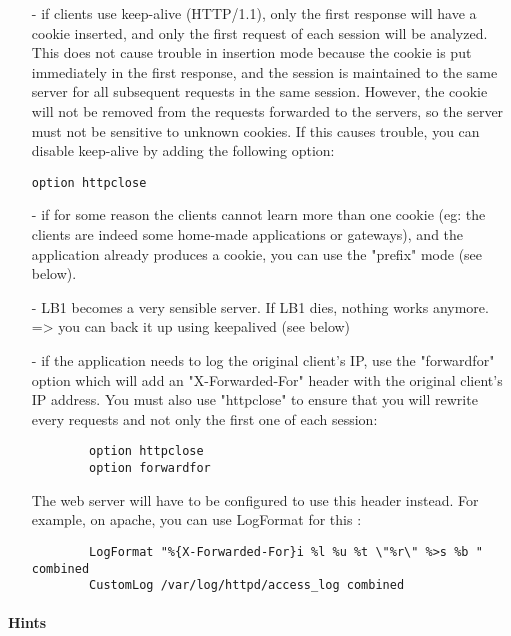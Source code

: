 \begin{itemize}
\item[-] if clients use keep-alive (HTTP/1.1), only the first response will have
   a cookie inserted, and only the first request of each session will be
   analyzed. This does not cause trouble in insertion mode because the cookie
   is put immediately in the first response, and the session is maintained to
   the same server for all subsequent requests in the same session. However,
   the cookie will not be removed from the requests forwarded to the servers,
   so the server must not be sensitive to unknown cookies. If this causes
   trouble, you can disable keep-alive by adding the following option:

        \verb|option httpclose|

\item[-] if for some reason the clients cannot learn more than one cookie (eg: the
   clients are indeed some home-made applications or gateways), and the
   application already produces a cookie, you can use the "prefix" mode (see
   below).

\item[-] LB1 becomes a very sensible server. If LB1 dies, nothing works anymore.
   => you can back it up using keepalived (see below)

\item[-] if the application needs to log the original client's IP, use the
   "forwardfor" option which will add an "X-Forwarded-For" header with the
   original client's IP address. You must also use "httpclose" to ensure
   that you will rewrite every requests and not only the first one of each
   session:

   \begin{verbatim}
        option httpclose
        option forwardfor
   \end{verbatim}

   The web server will have to be configured to use this header instead.
   For example, on apache, you can use LogFormat for this :
   \begin{verbatim}
        LogFormat "%{X-Forwarded-For}i %l %u %t \"%r\" %>s %b " combined
        CustomLog /var/log/httpd/access_log combined
   \end{verbatim}
\end{itemize}

\paragraph{Hints}

